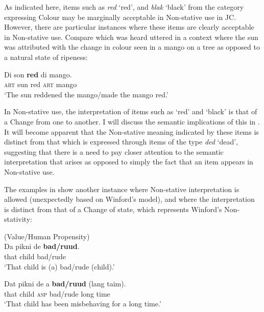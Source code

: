  \z \z

As indicated here, items such as \textit{red} `red', and \textit{blak}
 `black' from the category expressing Colour may be marginally
acceptable in Non-stative use in JC. However, there are particular instances where these items are clearly acceptable in Non-stative use.
Compare  which was heard uttered in a context where
the sun was attributed with the change in colour seen in a mango on a
tree as opposed to a natural state of ripeness:

\ea%
\label{ex:3:28d}
  \gll   Di  son \textbf{red} di mango.\\
\textsc{art} sun         red \textsc{art} mango  \\
\glt `The sun reddened the mango\slash made the mango red.' \z

In Non-stative use, the interpretation of items such as ‘red’ and
 `black' is that of a Change from one  to another.  I will discuss
the semantic implications of this in .  It will become
apparent that the Non-stative meaning indicated by these items is
distinct from that which is expressed through items of the type
\textit{ded} `dead', suggesting that there is a need to pay closer
attention to the semantic interpretation that arises as opposed to
simply the fact that an item appears in Non-stative use.

The examples in  show another instance where Non-stative
interpretation is allowed (unexpectedly based on Winford’s model), and
where the interpretation is distinct from that of a Change of state,
which represents Winford’s Non-stativity:

\ea%
\label{ex:3:29}
(Value\slash Human Propensity)  \\
\ea
\gll Da pikni      de      \textbf{bad/ruud}. \\
	that child   {\DEM}            bad/rude      \\
\glt `That child is (a) bad\slash rude (child).'

\ex
\gll Dat pikni     de            a \textbf{bad/ruud}     (lang taim).\\   
  	that child     {\DEM} \textsc{asp}     bad/rude {\db}long time  \\
    \glt `That child has been misbehaving for a long time.' \z \z

